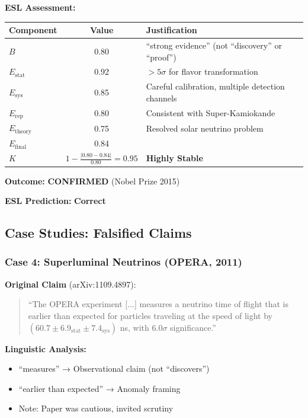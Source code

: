 \documentclass[11pt,a4paper]{article}
\begin{document}
\textbf{ESL Assessment:}
\begin{center}
\begin{tabular}{lcl}
\toprule
\textbf{Component} & \textbf{Value} & \textbf{Justification} \\
\midrule
$B$ & 0.80 & ``strong evidence'' (not ``discovery'' or ``proof'') \\
$E_{\text{stat}}$ & 0.92 & $>5\sigma$ for flavor transformation \\
$E_{\text{sys}}$ & 0.85 & Careful calibration, multiple detection channels \\
$E_{\text{rep}}$ & 0.80 & Consistent with Super-Kamiokande \\
$E_{\text{theory}}$ & 0.75 & Resolved solar neutrino problem \\
\midrule
$E_{\text{final}}$ & 0.84 & \\
\midrule
$K$ & $1 - \frac{|0.80 - 0.84|}{0.80} = 0.95$ & \textbf{Highly Stable} \\
\bottomrule
\end{tabular}
\end{center}

\textbf{Outcome:} \textcolor{green!60!black}{\textbf{CONFIRMED}} (Nobel Prize 2015)

\textbf{ESL Prediction:} \checkmark \textbf{Correct}

\subsection{Case Studies: Falsified Claims}

\subsubsection{Case 4: Superluminal Neutrinos (OPERA, 2011)}

\textbf{Original Claim} (arXiv:1109.4897):
\begin{quote}
``The OPERA experiment [...] measures a neutrino time of flight that is earlier than expected for particles traveling at the speed of light by $(60.7 \pm 6.9_{\text{stat}} \pm 7.4_{\text{sys}})$ ns, with $6.0\sigma$ significance.''
\end{quote}

\textbf{Linguistic Analysis:}
\begin{itemize}
    \item ``measures'' → Observational claim (not ``discovers'')
    \item ``earlier than expected'' → Anomaly framing
    \item Note: Paper was cautious, invited scrutiny
\end{itemize}
\end{document}

